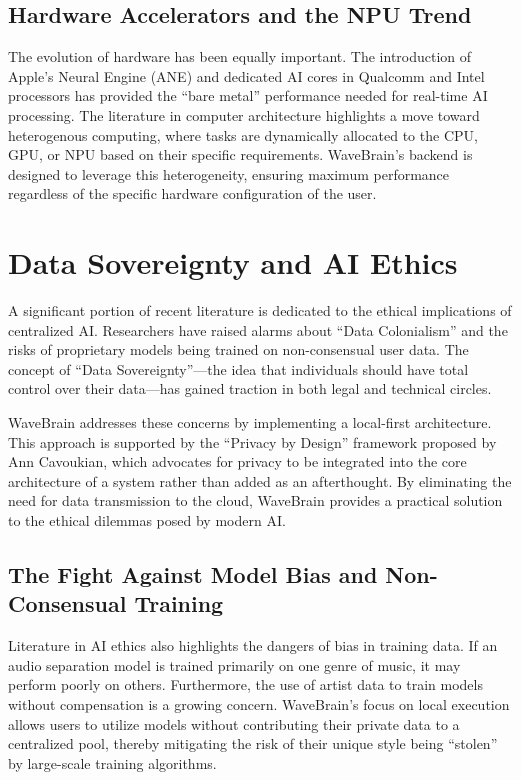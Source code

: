 \documentclass[12pt,a4paper]{article}
\begin{document}
\subsection{Hardware Accelerators and the NPU Trend}
The evolution of hardware has been equally important. The introduction of Apple's Neural Engine (ANE) and dedicated AI cores in Qualcomm and Intel processors has provided the ``bare metal'' performance needed for real-time AI processing. The literature in computer architecture highlights a move toward heterogenous computing, where tasks are dynamically allocated to the CPU, GPU, or NPU based on their specific requirements. WaveBrain's backend is designed to leverage this heterogeneity, ensuring maximum performance regardless of the specific hardware configuration of the user.

\section{Data Sovereignty and AI Ethics}
A significant portion of recent literature is dedicated to the ethical implications of centralized AI. Researchers have raised alarms about ``Data Colonialism'' and the risks of proprietary models being trained on non-consensual user data. The concept of ``Data Sovereignty''---the idea that individuals should have total control over their data---has gained traction in both legal and technical circles.

WaveBrain addresses these concerns by implementing a local-first architecture. This approach is supported by the ``Privacy by Design'' framework proposed by Ann Cavoukian, which advocates for privacy to be integrated into the core architecture of a system rather than added as an afterthought. By eliminating the need for data transmission to the cloud, WaveBrain provides a practical solution to the ethical dilemmas posed by modern AI.

\subsection{The Fight Against Model Bias and Non-Consensual Training}
Literature in AI ethics also highlights the dangers of bias in training data. If an audio separation model is trained primarily on one genre of music, it may perform poorly on others. Furthermore, the use of artist data to train models without compensation is a growing concern. WaveBrain's focus on local execution allows users to utilize models without contributing their private data to a centralized pool, thereby mitigating the risk of their unique style being ``stolen'' by large-scale training algorithms.
\end{document}
